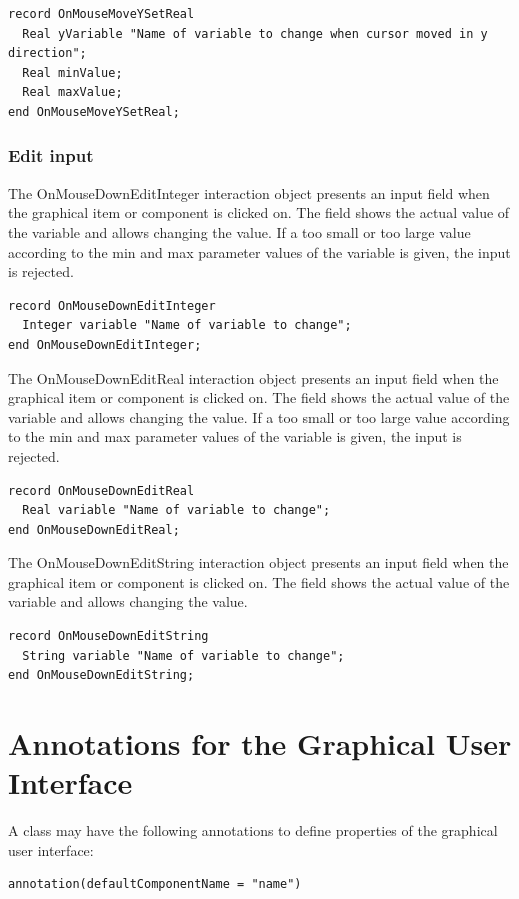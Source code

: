 \documentclass[10pt,a4paper]{report}
\def\doublelabel#1{\label{#1}}
\begin{document}
\begin{lstlisting}[language=modelica]
record OnMouseMoveYSetReal
  Real yVariable "Name of variable to change when cursor moved in y direction";
  Real minValue;
  Real maxValue;
end OnMouseMoveYSetReal;
\end{lstlisting}
\subsubsection{Edit input}\doublelabel{edit-input}

The OnMouseDownEditInteger interaction object presents an input field
when the graphical item or component is clicked on. The field shows the
actual value of the variable and allows changing the value. If a too
small or too large value according to the min and max parameter values
of the variable is given, the input is rejected.

\begin{lstlisting}[language=modelica]
record OnMouseDownEditInteger
  Integer variable "Name of variable to change";
end OnMouseDownEditInteger;
\end{lstlisting}
The OnMouseDownEditReal interaction object presents an input field when
the graphical item or component is clicked on. The field shows the
actual value of the variable and allows changing the value. If a too
small or too large value according to the min and max parameter values
of the variable is given, the input is rejected.

\begin{lstlisting}[language=modelica]
record OnMouseDownEditReal
  Real variable "Name of variable to change";
end OnMouseDownEditReal;
\end{lstlisting}
The OnMouseDownEditString interaction object presents an input field
when the graphical item or component is clicked on. The field shows the
actual value of the variable and allows changing the value.

\begin{lstlisting}[language=modelica]
record OnMouseDownEditString
  String variable "Name of variable to change";
end OnMouseDownEditString;
\end{lstlisting}
\section{Annotations for the Graphical User Interface}\doublelabel{annotations-for-the-graphical-user-interface}

A class may have the following annotations to define properties of the
graphical user interface:
\begin{lstlisting}[language=modelica]
 annotation(defaultComponentName = "name") 
\end{lstlisting}
\end{document}
